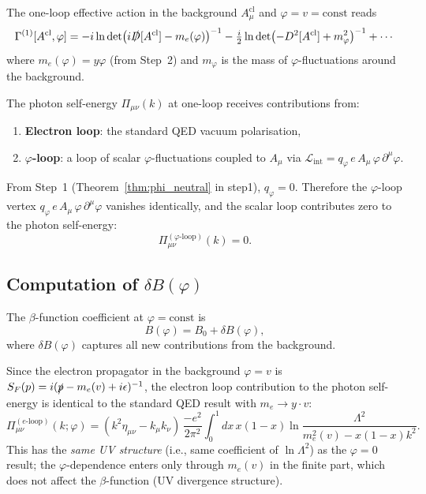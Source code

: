 \documentclass[12pt]{article}
\theoremstyle{definition}
\theoremstyle{remark}
\begin{document}
The one-loop effective action in the background $A_\mu^\mathrm{cl}$ and
$\varphi = v = \mathrm{const}$ reads
\begin{equation}
  \Gamma^{(1)}[A^\mathrm{cl},\varphi]
  = -i\ln\det\bigl(i\slashed{D}[A^\mathrm{cl}] - m_e(\varphi)\bigr)^{-1}
    - \tfrac{i}{2}\ln\det\bigl(-D^2[A^\mathrm{cl}] + m_\varphi^2\bigr)^{-1}
    + \cdots
\end{equation}
where $m_e(\varphi) = y\varphi$ (from Step~2) and $m_\varphi$ is the mass of
$\varphi$-fluctuations around the background.

The photon self-energy $\Pi_{\mu\nu}(k)$ at one-loop receives contributions from:
\begin{enumerate}
  \item \textbf{Electron loop}: the standard QED vacuum polarisation,
  \item \textbf{$\varphi$-loop}: a loop of scalar $\varphi$-fluctuations coupled to
        $A_\mu$ via $\mathcal{L}_\mathrm{int} = q_\varphi\,e\,A_\mu\,\varphi\,\partial^\mu\varphi$.
\end{enumerate}

From Step~1 (Theorem~\ref{thm:phi_neutral} in step1), $q_\varphi = 0$.  Therefore the
$\varphi$-loop vertex $q_\varphi\,e\,A_\mu\,\varphi\,\partial^\mu\varphi$ vanishes
identically, and the scalar loop contributes zero to the photon self-energy:
\begin{equation}
  \Pi_{\mu\nu}^{(\varphi\text{-loop})}(k) = 0.
\end{equation}

\subsection{Computation of $\delta B(\varphi)$}

The $\beta$-function coefficient at $\varphi = \mathrm{const}$ is
\begin{equation}
  B(\varphi) = B_0 + \delta B(\varphi),
\end{equation}
where $\delta B(\varphi)$ captures all new contributions from the background.

Since the electron propagator in the background $\varphi = v$ is
$S_F(p) = i(\slashed{p} - m_e(v) + i\epsilon)^{-1}$, the electron loop contribution
to the photon self-energy is identical to the standard QED result with $m_e \to y\cdot v$:
\begin{equation}
  \Pi^{(e\text{-loop})}_{\mu\nu}(k;\varphi) = (k^2\eta_{\mu\nu} - k_\mu k_\nu)\,
    \frac{-e^2}{2\pi^2}\int_0^1 dx\,x(1-x)\ln\frac{\Lambda^2}{m_e^2(v) - x(1-x)k^2}.
\end{equation}
This has the \emph{same UV structure} (i.e., same coefficient of $\ln\Lambda^2$) as the
$\varphi = 0$ result; the $\varphi$-dependence enters only through $m_e(v)$ in the finite
part, which does not affect the $\beta$-function (UV divergence structure).
\end{document}
